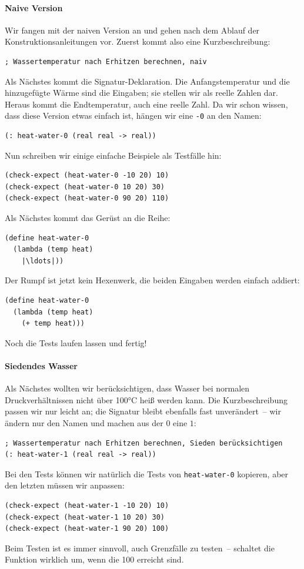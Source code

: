 \paragraph{Naive Version} Wir fangen mit der naiven Version an und gehen nach dem Ablauf der
Konstruktionsanleitungen vor.  Zuerst kommt also eine
Kurzbeschreibung:
%
\begin{lstlisting}
; Wassertemperatur nach Erhitzen berechnen, naiv
\end{lstlisting}
%
Als Nächstes kommt die Signatur-Deklaration.  Die Anfangstemperatur
und die hinzugefügte Wärme sind die Eingaben; sie stellen wir als
reelle Zahlen dar.  Heraus kommt die Endtemperatur, auch eine reelle
Zahl.  Da wir schon wissen, dass diese Version etwas einfach ist,
hängen wir eine \lstinline{-0} an den Namen:
%
\begin{lstlisting}
(: heat-water-0 (real real -> real))
\end{lstlisting}                
%
Nun schreiben wir einige einfache Beispiele als Testfälle hin:
%
\begin{lstlisting}
(check-expect (heat-water-0 -10 20) 10)
(check-expect (heat-water-0 10 20) 30)
(check-expect (heat-water-0 90 20) 110)
\end{lstlisting}
%
Als Nächstes kommt das Gerüst an die Reihe:
%
\begin{lstlisting}
(define heat-water-0
  (lambda (temp heat)
    |\ldots|))
\end{lstlisting}
%
Der Rumpf ist jetzt kein Hexenwerk, die beiden Eingaben werden
einfach addiert:
%
\begin{lstlisting}
(define heat-water-0
  (lambda (temp heat)
    (+ temp heat)))
\end{lstlisting}
%
Noch die Tests laufen lassen und fertig!

\paragraph{Siedendes Wasser} Als Nächstes wollten wir berücksichtigen,
dass Wasser bei normalen Druckverhältnissen nicht über 100\si{\degree}C heiß werden kann.  Die Kurzbeschreibung
passen wir nur leicht an; die Signatur bleibt ebenfalls fast
unverändert~-- wir ändern nur den Namen und machen aus der $0$ eine $1$:
%
\begin{lstlisting}
; Wassertemperatur nach Erhitzen berechnen, Sieden berücksichtigen
(: heat-water-1 (real real -> real))
\end{lstlisting}
%
Bei den Tests können wir natürlich die Tests von \lstinline{heat-water-0}
kopieren, aber den letzten müssen wir anpassen:
%
\begin{lstlisting}
(check-expect (heat-water-1 -10 20) 10)
(check-expect (heat-water-1 10 20) 30)
(check-expect (heat-water-1 90 20) 100)
\end{lstlisting}
%
Beim Testen ist es immer sinnvoll, auch Grenzfälle zu testen~--
schaltet die Funktion wirklich um, wenn die 100 erreicht sind. %
                              
